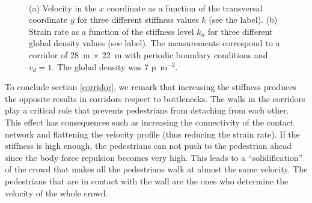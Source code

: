 \documentclass[preprint,12pt]{elsarticle}
\begin{document}
\begin{figure}[!htbp]
\centering
    \ 
    \\
\caption[width=0.47\columnwidth]{(a) Velocity in the $x$ coordinate as a function of the transversal coordinate $y$ for three different stiffness values $k$ (see the label). (b) Strain rate as a function of the stiffness level $k_n$ for three different global density values (see label). The measurements correspond to a corridor of 28~m $\times$ 22~m with periodic boundary conditions and $v_d=1$. The global density was 7 p~m$^{-2}$.  }
\label{profile_strain}
\end{figure}


To conclude section \ref{corridor}, we remark that increasing the stiffness produces the opposite results in corridors respect to bottlenecks. The walls in the corridors play a critical role that prevents pedestrians from detaching from each other. This effect has consequences such as increasing the connectivity of the contact network and flattening the velocity profile (thus reducing the strain rate). If the stiffness is high enough, the pedestrians can not push to the pedestrian ahead since the body force repulsion becomes very high. This leads to a ``solidification'' of the crowd that makes all the pedestrians walk at almost the same velocity. The pedestrians that are in contact with the wall are the ones who determine the velocity of the whole crowd. \\
\end{document}

